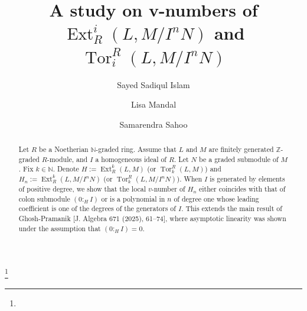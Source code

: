 \documentclass[11pt,reqno]{amsart}
\theoremstyle{definition}
\newcommand{\Z}{\mathbb{Z}}
\newcommand{\N}{\mathbb{N}}
\newcommand{\Ext}{\operatorname{Ext}}
\newcommand{\Tor}{\operatorname{Tor}}
\begin{document}
\title[]{A study on v-numbers of $\Ext^i_R(L,M/I^nN)$ and $\Tor_i^R(L,M/I^nN)$}

\author[Sayed Sadiqul Islam]{Sayed Sadiqul Islam}
\address{Indian Institute of Technology Bombay, Mumbai, India}

\author{Lisa Mandal}
\address{Department of Mathematics and Statistics, Indian Institute of Science Education and Research Kolkata, Mohanpur, India}

\author{Samarendra Sahoo}
\address{Indian Institute of Technology Dharwad, Dharwad 580011, Karnataka, India}

 
\thanks{}
 
\begin{abstract} 
Let $R$ be a Noetherian $\N$-graded ring. Assume that $L$ and  $M$ are finitely generated $\Z$-graded $R$-module, and $I$ a homogeneous ideal of $R$. Let $N$ be a graded submodule of $M$. Fix $k\in \N$. Denote $H:=\Ext^k_R(L,M)$ (or $\Tor_k^R(L,M)$) and $H_n:=\Ext^k_R(L, M/I^nN)$ (or $\Tor_k^R(L,M/I^nN)$). When $I$ is generated by elements of positive degree, we show that the local $v$-number of $H_n$ either coincides with that of colon submodule $(0:_HI)$ or is a polynomial in $n$ of degree one whose leading coefficient is one of the degrees of the generators of $I$. This extends the main result of Ghosh-Pramanik [J. Algebra 671 (2025), 61–74], where asymptotic linearity was shown under the assumption that $(0:_HI)=0$.
\end{abstract}
\maketitle
\end{document}
